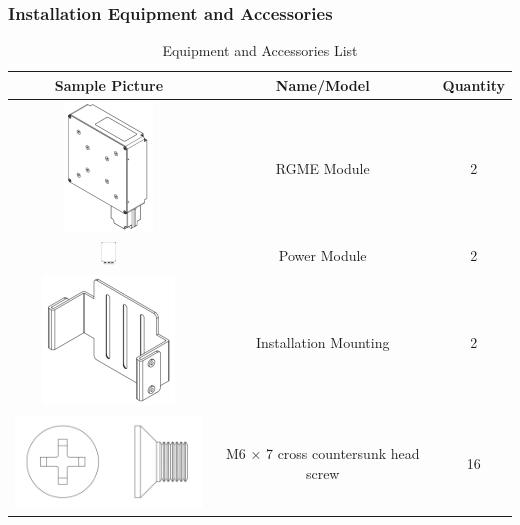 \documentclass{article}
\begin{document}
\subsubsection{Installation Equipment and Accessories}
\clearpage
\begin{table}[H]
    \centering
    \caption{Equipment and Accessories List}
    \begin{tabular}{|c|c|c|}
        \hline
        \toprule
        Sample Picture & Name/Model & Quantity \\
        \midrule
        \includegraphics{RGME module.png}       & RGME Module                                             & 2 \\ \hline
        \includegraphics[width=0.08\textwidth]{Power module.png}      & Power Module                                            & 2 \\ \hline
        \includegraphics{Mounting.png}          & Installation Mounting                                   & 2 \\ \hline
        \includegraphics{M6x7.png}              & M6 × 7 cross countersunk head screw                     & 16 \\ \hline

\end{tabular}
\end{table}
\end{document}
